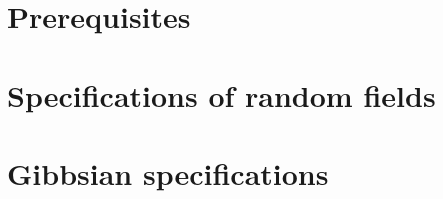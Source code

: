 
\chapter{Prerequisites}



\chapter{Specifications of random fields}





\chapter{Gibbsian specifications}



